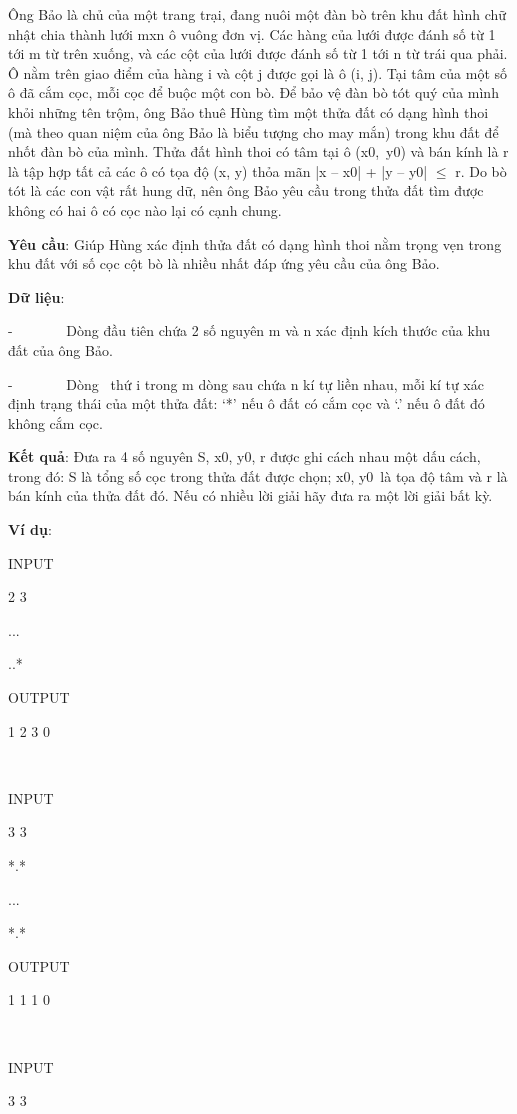 

Ông Bảo là chủ của một trang trại, đang nuôi một đàn bò trên khu đất hình chữ nhật chia thành lưới mxn ô vuông đơn vị. Các hàng của lưới được đánh số từ 1 tới m từ trên xuống, và các cột của lưới được đánh số từ 1 tới n từ trái qua phải. Ô nằm trên giao điểm của hàng i và cột j được gọi là ô (i, j). Tại tâm của một số ô đã cắm cọc, mỗi cọc để buộc một con bò. Để bảo vệ đàn bò tót quý của mình khỏi những tên trộm, ông Bảo thuê Hùng tìm một thửa đất có dạng hình thoi (mà theo quan niệm của ông Bảo là biểu tượng cho may mắn) trong khu đất để nhốt đàn bò của mình. Thửa đất hình thoi có tâm tại ô (x0, y0) và bán kính là r là tập hợp tất cả các ô có tọa độ (x, y) thỏa mãn |x – x0| + |y – y0|  $\le$  r. Do bò tót là các con vật rất hung dữ, nên ông Bảo yêu cầu trong thửa đất tìm được không có hai ô có cọc nào lại có cạnh chung.

\textbf{Yêu cầu}: Giúp Hùng xác định thửa đất có dạng hình thoi nằm trọng vẹn trong khu đất với số cọc cột bò là nhiều nhất đáp ứng yêu cầu của ông Bảo.

\textbf{Dữ liệu}:

-        Dòng đầu tiên chứa 2 số nguyên m và n xác định kích thước của khu đất của ông Bảo.

-        Dòng  thứ i trong m dòng sau chứa n kí tự liền nhau, mỗi kí tự xác định trạng thái của một thửa đất: ‘*’ nếu ô đất có cắm cọc và ‘.’ nếu ô đất đó không cắm cọc.

\textbf{Kết quả}: Đưa ra 4 số nguyên S, x0, y0, r được ghi cách nhau một dấu cách, trong đó: S là tổng số cọc trong thửa đất được chọn; x0, y0 là tọa độ tâm và r là bán kính của thửa đất đó. Nếu có nhiều lời giải hãy đưa ra một lời giải bất kỳ.

\textbf{Ví dụ}:

INPUT

2 3

...

..*

OUTPUT

1 2 3 0

 

INPUT

3 3

*.*

...

*.*

OUTPUT

1 1 1 0

 

INPUT

3 3

